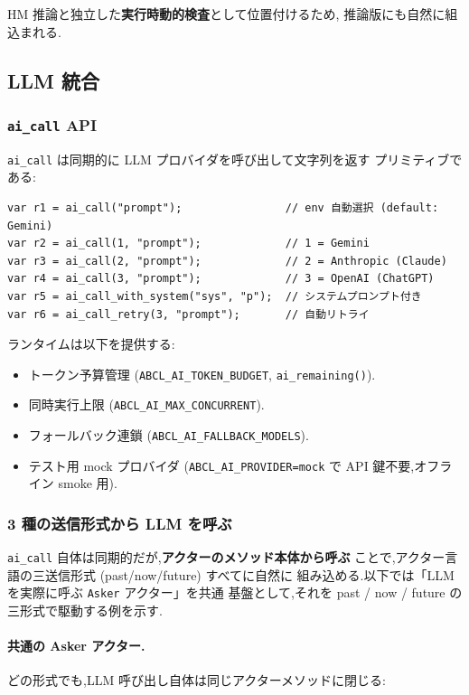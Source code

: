 \documentclass[11pt,a4paper]{article}
\newcommand{\code}[1]{\texttt{\small #1}}
\begin{document}
HM 推論と独立した\textbf{実行時動的検査}として位置付けるため,
推論版にも自然に組込まれる.

\subsection{LLM 統合}
\label{sec:llm}

\subsubsection{\code{ai\_call} API}

\code{ai\_call} は同期的に LLM プロバイダを呼び出して文字列を返す
プリミティブである:

\begin{lstlisting}
var r1 = ai_call("prompt");                // env 自動選択 (default: Gemini)
var r2 = ai_call(1, "prompt");             // 1 = Gemini
var r3 = ai_call(2, "prompt");             // 2 = Anthropic (Claude)
var r4 = ai_call(3, "prompt");             // 3 = OpenAI (ChatGPT)
var r5 = ai_call_with_system("sys", "p");  // システムプロンプト付き
var r6 = ai_call_retry(3, "prompt");       // 自動リトライ
\end{lstlisting}

ランタイムは以下を提供する:

\begin{itemize}[leftmargin=*,itemsep=0pt]
  \item トークン予算管理 (\code{ABCL\_AI\_TOKEN\_BUDGET}, \code{ai\_remaining()}).
  \item 同時実行上限 (\code{ABCL\_AI\_MAX\_CONCURRENT}).
  \item フォールバック連鎖 (\code{ABCL\_AI\_FALLBACK\_MODELS}).
  \item テスト用 mock プロバイダ (\code{ABCL\_AI\_PROVIDER=mock} で
    API 鍵不要,オフライン smoke 用).
\end{itemize}

\subsubsection{3 種の送信形式から LLM を呼ぶ}

\code{ai\_call} 自体は同期的だが,\textbf{アクターのメソッド本体から呼ぶ}
ことで,アクター言語の三送信形式 (past/now/future) すべてに自然に
組み込める.以下では「LLM を実際に呼ぶ \code{Asker} アクター」を共通
基盤として,それを past / now / future の三形式で駆動する例を示す.

\paragraph{共通の Asker アクター.}
どの形式でも,LLM 呼び出し自体は同じアクターメソッドに閉じる:
\end{document}
